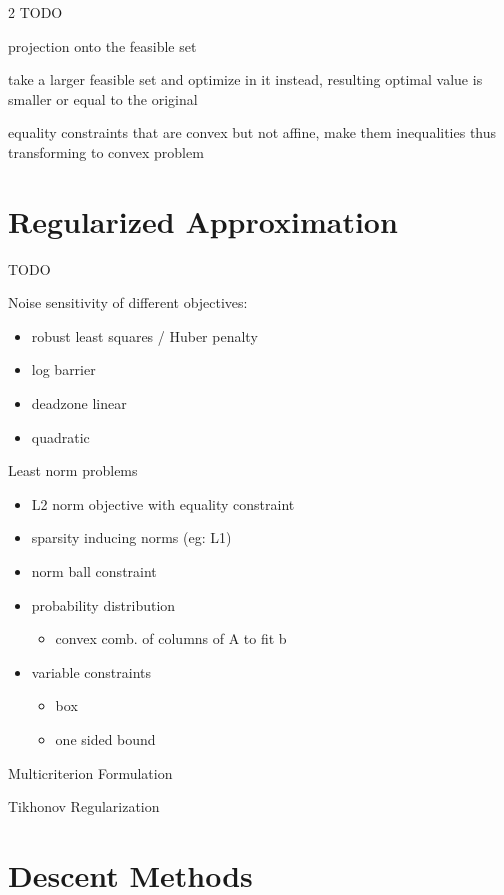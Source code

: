\documentclass[8pt]{extarticle}
\begin{document}
\begin{multicols*}{2}
  TODO
  
  projection onto the feasible set

  take a larger feasible set and optimize in it instead, resulting optimal value is smaller or equal to the original

  equality constraints that are convex but not affine, make them inequalities thus transforming to convex problem
  
  \vfill\null
  \columnbreak

  \section{Regularized Approximation}

  TODO
  
  Noise sensitivity of different objectives:
  \begin{itemize}
  \item robust least squares / Huber penalty
  \item log barrier
  \item deadzone linear
  \item quadratic
  \end{itemize}

  Least norm problems
  \begin{itemize}
  \item L2 norm objective with equality constraint
  \item sparsity inducing norms (eg: L1)
  \item norm ball constraint
  \item probability distribution
    \begin{itemize}
    \item convex comb. of columns of A to fit b
    \end{itemize}
  \item variable constraints
    \begin{itemize}
    \item box
    \item one sided bound
    \end{itemize}
  \end{itemize}

  Multicriterion Formulation

  Tikhonov Regularization
  
  \vfill\null
  \pagebreak

  \section{Descent Methods}


\end{multicols*}
\end{document}
